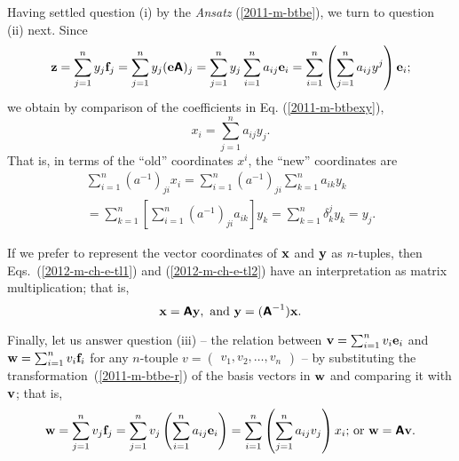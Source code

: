 Having settled question (i) by the {\it Ansatz}
(\ref{2011-m-btbe}),
we turn to question (ii) next.
Since
\begin{equation}
{\bf z} =
 \sum_{j=1}^n y_j {\bf f}_j=
 \sum_{j=1}^n  y_j ({\bf e}\textsf{\textbf{A}})_j=
 \sum_{j=1}^n  y_j  \sum_{i=1}^n a_{ij} {\bf e}_i=
  \sum_{i=1}^n \left(\sum_{j=1}^n  a_{ij} y^j \right)   {\bf e}_i;
\end{equation}
we obtain by comparison of the coefficients in Eq. (\ref{2011-m-btbexy}),
\begin{equation}
x_i= \sum_{j=1}^n a_{ij} y_j.
\label{2012-m-ch-e-tl1}
\end{equation}
That is, in terms of the ``old'' coordinates $x^i$,
the ``new'' coordinates are
\begin{equation}
\begin{split}
\sum_{i=1}^n (a^{-1})_{ji} x_i= \sum_{i=1}^n (a^{-1})_{ji}  \sum_{k=1}^n  a_{ik} y_k \\
=  \sum_{k=1}^n \left[ \sum_{i=1}^n (a^{-1})_{ji}  a_{ik} \right] y_k
=   \sum_{k=1}^n \delta^j_k y_k
=  y_j
.
\label{2012-m-ch-e-tl2}
\end{split}
\end{equation}

If we prefer to represent the vector coordinates of
${\bf x}$ and ${\bf y}$ as $n$-tuples,
then Eqs.~(\ref{2012-m-ch-e-tl1})  and (\ref{2012-m-ch-e-tl2})
have an interpretation as matrix multiplication; that is,
\begin{equation}
{\bf x} =  \textsf{\textbf{A}}{\bf y}, {\text{ and }}
{\bf y} =  (\textsf{\textbf{A}}^{-1}){\bf x}
.
\label{2012-m-ch-e-tl3}
\end{equation}

Finally, let us answer question (iii)
-- the relation between ${\bf v}=\sum_{i=1}^n v_i {\bf e}_i$ and ${\bf w}=\sum_{i=1}^n v_i {\bf f}_i$ for any $n$-touple $v = \begin{pmatrix} v_1, v_2, \ldots , v_n \end{pmatrix}$ --
by substituting the transformation~(\ref{2011-m-btbe-r}) of the basis vectors in ${\bf w}$ and comparing it with ${\bf v}$; that is,
\begin{equation}
{\bf w}= \sum_{j=1}^n v_j {\bf f}_j  = \sum_{j=1}^n v_j \left( \sum_{i=1}^n a_{ij} {\bf e}_i \right)= \sum_{i=1}^n \left( \sum_{j=1}^n a_{ij}  v_j \right)  x_i
\textrm{;  or } {\bf w} = \textsf{\textbf{A}} {\bf v}.
\end{equation}




